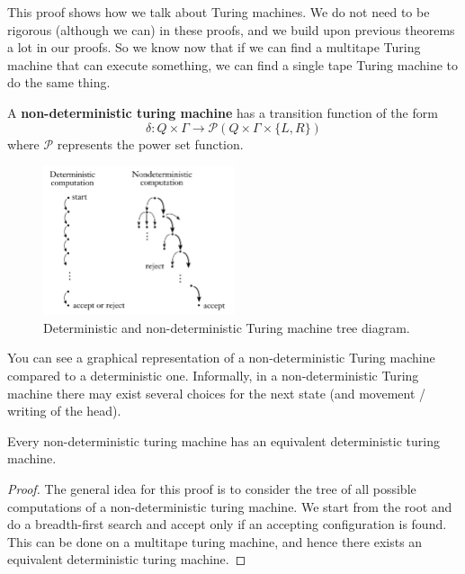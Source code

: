 This proof shows how we talk about Turing machines. We do not need to be rigorous (although we can) in these proofs, and we build upon previous theorems a lot in our proofs. So we know now that if we can find a multitape Turing machine that can execute something, we can find a single tape Turing machine to do the same thing.

\begin{definition}[]
    A \textbf{non-deterministic turing machine} has a transition function of the form \[ \delta: Q \times \Gamma \to \mathcal P(Q \times \Gamma \times \{L, R\}) \] where $\mathcal P$ represents the power set function.
\end{definition}

\begin{figure}
    \centering
    \includegraphics[width = 0.5\textwidth]{images/non-deterministic-turing-machine.png}
    \caption{Deterministic and non-deterministic Turing machine tree diagram.}
    \label{fig:non-deterministic-turing-machine}
\end{figure}

You can see a graphical representation of a non-deterministic Turing machine compared to a deterministic one. Informally, in a non-deterministic Turing machine there may exist several choices for the next state (and movement / writing of the head).

\begin{theorem}[]
    Every non-deterministic turing machine has an equivalent deterministic turing machine.
\end{theorem}

\begin{proof}
    The general idea for this proof is to consider the tree of all possible computations of a non-deterministic turing machine. We start from the root and do a breadth-first search and accept only if an accepting configuration is found. This can be done on a multitape turing machine, and hence there exists an equivalent deterministic turing machine.
\end{proof}
